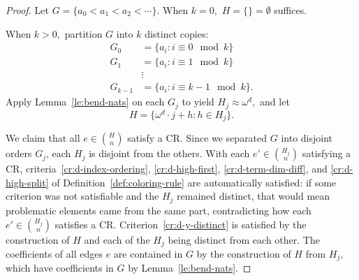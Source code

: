 \documentclass[11pt]{article}
\newcommand{\om}{\omega}
\newcommand{\oequiv}{\approx}
\newcommand{\crulenospace}{CR}
\newcommand{\crules}{\crulenospace s~}
\newcommand{\idegr}{j}
\newcommand{\commonconst}{a}
\newcommand{\rareconst}{b}
\theoremstyle{plain}
\theoremstyle{definition}
\begin{document}
\begin{proof}
Let $G = \{\commonconst_0 < \commonconst_1 < \commonconst_2 < \cdots \}$.
When $k = 0,$ $H = \{\} = \emptyset$ suffices.

When $k > 0,$ partition $G$ into $k$ distinct copies: \begin{align*}
    G_0 &= \{a_i : i \equiv 0 \mod k\}\\
    G_1 &= \{a_i : i \equiv 1 \mod k\}\\
    &\vdots\\
    G_{k-1} &= \{a_i : i \equiv k-1 \mod k\}.
\end{align*}
Apply Lemma~\ref{le:bend-nats} on each $G_j$ to yield $H_j \oequiv \om^d,$
and let $$H = 
\{\om^{d} \cdot j + h : h \in H_j\}.$$

We claim that all $e \in \binom{H}{n}$ satisfy a \crulenospace. Since we separated $G$ into disjoint orders $G_{\idegr}$, each $H_{\idegr}$ is disjoint from the others.
With each $e' \in \binom{H_j}{n}$
satisfying a \crulenospace,
criteria~\ref{cr:d-index-ordering}, \ref{cr:d-high-first},
\ref{cr:d-term-dim-diff}, and \ref{cr:d-high-split}
of Definition~\ref{def:coloring-rule}
are automatically satisfied: if some
criterion was not satisfiable and the $H_{\idegr}$ remained distinct, that would
mean problematic elements came from the same part, contradicting how each $e' \in \binom{H_j}{n}$
satisfies a \crulenospace.
Criterion~\ref{cr:d-y-distinct} is satisfied by the construction
of $H$ and each of the
$H_{\idegr}$ being distinct from each other.
The coefficients of all edges $e$ are contained in $G$ by the construction of $H$ from $H_j,$
which have coefficients in $G$ by Lemma~\ref{le:bend-nats}.



\end{proof}
\end{document}
